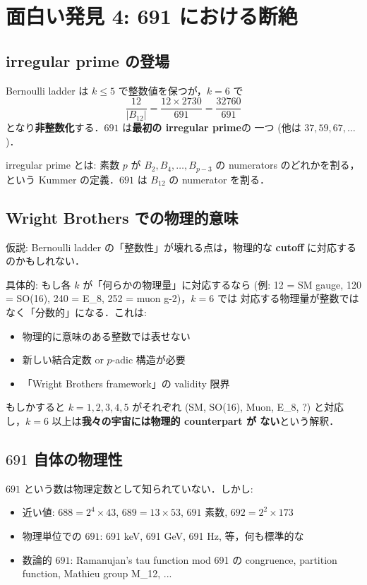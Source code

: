 \documentclass[11pt,a4paper]{article}
\begin{document}
\section{面白い発見 4: 691 における断絶}

\subsection{irregular prime の登場}

Bernoulli ladder は $k \leq 5$ で整数値を保つが，$k = 6$ で
\begin{equation}
\frac{12}{|B_{12}|} = \frac{12 \times 2730}{691} = \frac{32760}{691}
\end{equation}
となり\textbf{非整数化}する．$691$ は\textbf{最初の irregular prime}の
一つ (他は $37, 59, 67, \ldots$)．

irregular prime とは: 素数 $p$ が $B_2, B_4, \ldots, B_{p-3}$ の
numerators のどれかを割る，という Kummer の定義．$691$ は $B_{12}$ の
numerator を割る．

\subsection{Wright Brothers での物理的意味}

仮説: Bernoulli ladder の「整数性」が壊れる点は，物理的な
\textbf{cutoff} に対応するのかもしれない．

具体的: もし各 $k$ が「何らかの物理量」に対応するなら (例: 12 = SM
gauge, 120 = SO(16), 240 = E_8, 252 = muon g-2)，$k = 6$ では
対応する物理量が整数ではなく「分数的」になる．これは:

\begin{itemize}
\item 物理的に意味のある整数では表せない
\item 新しい結合定数 or $p$-adic 構造が必要
\item 「Wright Brothers framework」の validity 限界
\end{itemize}

もしかすると $k = 1, 2, 3, 4, 5$ がそれぞれ (SM, SO(16), Muon, E_8, ?)
と対応し，$k = 6$ 以上は\textbf{我々の宇宙には物理的 counterpart が
ない}という解釈．

\subsection{$691$ 自体の物理性}

$691$ という数は物理定数として知られていない．しかし:
\begin{itemize}
\item 近い値: $688 = 2^4 \times 43$, $689 = 13 \times 53$, $691$ 素数, $692 = 2^2 \times 173$
\item 物理単位での $691$: 691 keV, 691 GeV, 691 Hz, 等，何も標準的な
\item 数論的 $691$: Ramanujan's tau function mod 691 の congruence,
partition function, Mathieu group M_{12}, ...
\end{itemize}
\end{document}
